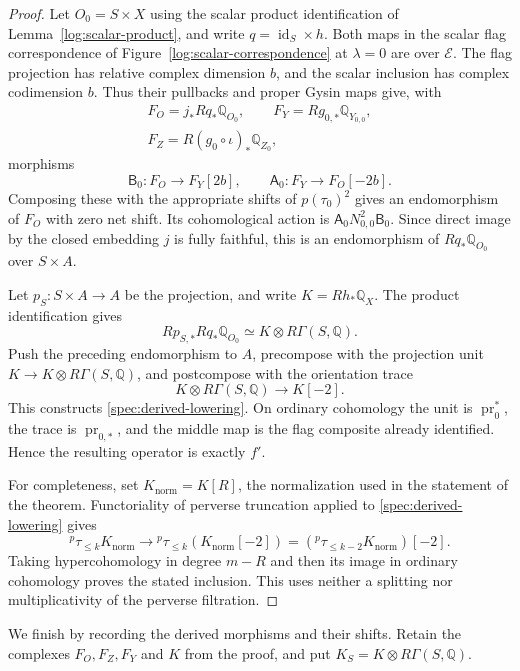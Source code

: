 \begin{proof}
Let $O_0=S\times X$ using the scalar product identification of
Lemma~\ref{log:scalar-product}, and write $q=\operatorname{id}_S\times h$.
Both maps in the scalar flag correspondence of
Figure~\ref{log:scalar-correspondence} at $\lambda=0$ are over $\mathcal E$.
The flag projection has relative complex dimension $b$, and the scalar
inclusion has complex codimension $b$.  Thus their pullbacks and proper
Gysin maps give, with
\[
 \begin{gathered}
 F_O=j_*Rq_*\mathbb Q_{O_0},\qquad
 F_Y=Rg_{0,*}\mathbb Q_{Y_{0,0}},\\
 F_Z=R(g_0\circ\iota)_*\mathbb Q_{Z_0},
 \end{gathered}
\]
morphisms
\[
 \mathsf B_0:F_O\longrightarrow F_Y[2b],
 \qquad
 \mathsf A_0:F_Y\longrightarrow F_O[-2b].
\]
Composing these with the appropriate shifts of $p(\tau_0)^2$ gives an
endomorphism of $F_O$ with zero net shift.  Its cohomological action is
$\mathsf A_0N_{0,0}^2\mathsf B_0$.
Since direct image by the closed embedding $j$ is fully faithful, this is
an endomorphism of $Rq_*\mathbb Q_{O_0}$ over $S\times A$.

Let $p_S:S\times A\to A$ be the projection, and write
$K=Rh_*\mathbb Q_X$.  The product identification gives
\[
 Rp_{S,*}Rq_*\mathbb Q_{O_0}
 \simeq K\otimes R\Gamma(S,\mathbb Q).
\]
Push the preceding endomorphism to $A$, precompose with the projection unit
$K\to K\otimes R\Gamma(S,\mathbb Q)$, and postcompose with the orientation
trace
\[
 K\otimes R\Gamma(S,\mathbb Q)\longrightarrow K[-2].
\]
This constructs \eqref{spec:derived-lowering}.  On ordinary cohomology the
unit is $\operatorname{pr}_0^*$, the trace is
$\operatorname{pr}_{0,*}$, and the middle map is the flag composite already
identified.  Hence the resulting operator is exactly $f'$.

For completeness, set $K_{\mathrm{norm}}=K[R]$, the normalization used in
the statement of the theorem.  Functoriality of perverse truncation applied
to \eqref{spec:derived-lowering} gives
\[
 {}^p\tau_{\le k}K_{\mathrm{norm}}
 \longrightarrow{}^p\tau_{\le k}(K_{\mathrm{norm}}[-2])
 =({}^p\tau_{\le k-2}K_{\mathrm{norm}})[-2].
\]
Taking hypercohomology in degree $m-R$ and then its image in ordinary
cohomology proves the stated inclusion.  This uses neither a splitting nor
multiplicativity of the perverse filtration.
\end{proof}

We finish by recording the derived morphisms and their shifts. Retain the
complexes $F_O,F_Z,F_Y$ and $K$ from the proof, and put
$K_S=K\otimes R\Gamma(S,\mathbb Q)$.

